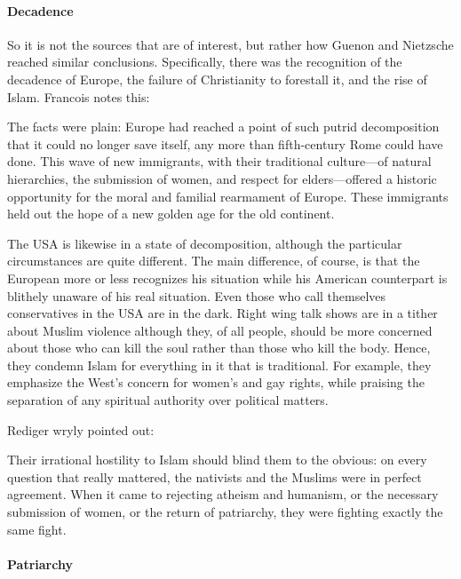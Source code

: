 \paragraph{Decadence}


So it is not the sources that are of interest, but rather how Guenon and Nietzsche reached similar conclusions. Specifically, there was the recognition of the decadence of Europe, the failure of Christianity to forestall it, and the rise of Islam. Francois notes this:

\begin{quotex}
The facts were plain: Europe had reached a point of such putrid decomposition that it could no longer save itself, any more than fifth-century Rome could have done. This wave of new immigrants, with their traditional culture---of natural hierarchies, the submission of women, and respect for elders---offered a historic opportunity for the moral and familial rearmament of Europe. These immigrants held out the hope of a new golden age for the old continent.
\end{quotex}


The USA is likewise in a state of decomposition, although the particular circumstances are quite different. The main difference, of course, is that the European more or less recognizes his situation while his American counterpart is blithely unaware of his real situation. Even those who call themselves conservatives in the USA are in the dark. Right wing talk shows are in a tither about Muslim violence although they, of all people, should be more concerned about those who can kill the soul rather than those who kill the body. Hence, they condemn Islam for everything in it that is traditional. For example, they emphasize the West's concern for women's and gay rights, while praising the separation of any spiritual authority over political matters.

Rediger wryly pointed out:

\begin{quotex}
Their irrational hostility to Islam should blind them to the obvious: on every question that really mattered, the nativists and the Muslims were in perfect agreement. When it came to rejecting atheism and humanism, or the necessary submission of women, or the return of patriarchy, they were fighting exactly the same fight.
\end{quotex}


\paragraph{Patriarchy}


